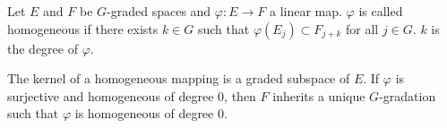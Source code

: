 Let $E$ and $F$ be $G$-graded spaces and $\varphi: E \to F$ a linear map. $\varphi$ is called homogeneous if there exists $k \in G$ such that $\varphi(E_j) \subset F_{j+k}$ for all $j \in G$. $k$ is the degree of $\varphi$.

The kernel of a homogeneous mapping is a graded subspace of $E$. If $\varphi$ is surjective and homogeneous of degree $0$, then $F$ inherits a unique $G$-gradation such that $\varphi$ is homogeneous of degree $0$.

